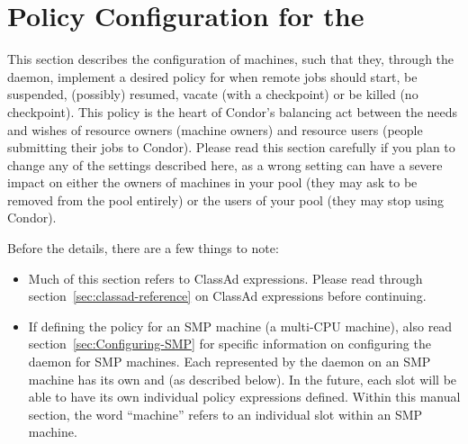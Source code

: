 \section{\label{sec:Configuring-Policy}Policy Configuration for the }

This section describes the configuration of machines,
such that they,
through the  daemon,
implement a desired policy for when remote jobs should start, be
suspended, (possibly) resumed, vacate (with a checkpoint) or be killed
(no checkpoint).
This policy is the heart of Condor's balancing act
between the needs and wishes of resource owners (machine owners) and
resource users (people submitting their jobs to Condor).
Please read
this section carefully if you plan to change any of the settings
described here, as a wrong setting can have a severe impact on
either the owners of machines in your pool (they may
ask to be removed from the pool entirely) or the users of your pool
(they may stop using Condor).

Before the details, there are a few things to note:
\begin{itemize}
\item Much of this section refers to ClassAd expressions.
Please read through section~\ref{sec:classad-reference} on
ClassAd expressions before continuing.

\item If defining the policy for an SMP machine
(a multi-CPU machine),
also read section~\ref{sec:Configuring-SMP} for specific information on
configuring the  daemon for SMP machines.  
Each  represented by the  daemon on an
SMP machine has its own  and 
(as described below). 
In the future, each slot will be able to have its
own individual policy expressions defined.
Within this manual section, the word ``machine''
refers to an individual slot within
an SMP machine.
\end{itemize}

